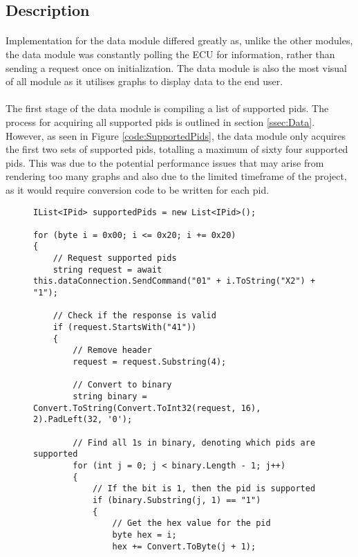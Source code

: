	\subsection{Description}{		
		\paragraph{}{
		Implementation for the data module differed greatly as, unlike the other modules, the data module was constantly polling the ECU for information, rather than sending a request once on initialization. The data module is also the most visual of all module as it utilises graphs to display data to the end user.
		}
		
		\paragraph{}{
		The first stage of the data module is compiling a list of supported pids. The process for acquiring all supported pids is outlined in section \ref{ssec:Data}. However, as seen in Figure \ref{code:SupportedPids}, the data module only acquires the first two sets of supported pids, totalling a maximum of sixty four supported pids. This was due to the potential performance issues that may arise from rendering too many graphs and also due to the limited timeframe of the project, as it would require conversion code to be written for each pid.
		}
		
		\begin{figure}[h]
			\begin{lstlisting}
IList<IPid> supportedPids = new List<IPid>();

for (byte i = 0x00; i <= 0x20; i += 0x20)
{
	// Request supported pids
	string request = await this.dataConnection.SendCommand("01" + i.ToString("X2") + "1");

	// Check if the response is valid
	if (request.StartsWith("41"))
	{
		// Remove header
		request = request.Substring(4);

		// Convert to binary
		string binary = Convert.ToString(Convert.ToInt32(request, 16), 2).PadLeft(32, '0');

		// Find all 1s in binary, denoting which pids are supported
		for (int j = 0; j < binary.Length - 1; j++)
		{
			// If the bit is 1, then the pid is supported
			if (binary.Substring(j, 1) == "1")
			{
				// Get the hex value for the pid
				byte hex = i;
				hex += Convert.ToByte(j + 1);
								

\end{lstlisting}
\end{figure}}
